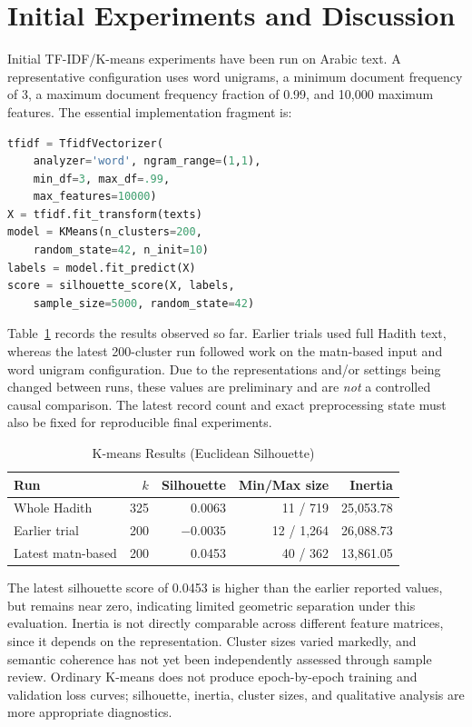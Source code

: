 \documentclass[conference]{IEEEtran}
\begin{document}
\section{Initial Experiments and Discussion}
Initial TF-IDF/K-means experiments have been run on Arabic text. A representative configuration uses word unigrams, a minimum document frequency of 3, a maximum document frequency fraction of 0.99, and 10,000 maximum features. The essential implementation fragment is:

\begin{lstlisting}[language=Python]
tfidf = TfidfVectorizer(
    analyzer='word', ngram_range=(1,1),
    min_df=3, max_df=.99,
    max_features=10000)
X = tfidf.fit_transform(texts)
model = KMeans(n_clusters=200,
    random_state=42, n_init=10)
labels = model.fit_predict(X)
score = silhouette_score(X, labels,
    sample_size=5000, random_state=42)
\end{lstlisting}

Table~\ref{tab:exp} records the results observed so far. Earlier trials used full Hadith text, whereas the latest 200-cluster run followed work on the matn-based input and word unigram configuration. Due to the representations and/or settings being changed between runs, these values are preliminary and are \emph{not} a controlled causal comparison. The latest record count and exact preprocessing state must also be fixed for reproducible final experiments.

\begin{table}[t]
\caption{K-means Results (Euclidean Silhouette)}
\label{tab:exp}
\centering\footnotesize
\begin{tabular}{lrrrr}
\toprule
Run & $k$ & Silhouette & Min/Max size & Inertia\\
\midrule
Whole Hadith & 325 & 0.0063 & 11 / 719 & 25,053.78\\
Earlier trial & 200 & $-0.0035$ & 12 / 1,264 & 26,088.73\\
Latest matn-based & 200 & 0.0453 & 40 / 362 & 13,861.05\\
\bottomrule
\end{tabular}
\end{table}

The latest silhouette score of 0.0453 is higher than the earlier reported values, but remains near zero, indicating limited geometric separation under this evaluation. Inertia is not directly comparable across different feature matrices, since it depends on the representation. Cluster sizes varied markedly, and semantic coherence has not yet been independently assessed through sample review. Ordinary K-means does not produce epoch-by-epoch training and validation loss curves; silhouette, inertia, cluster sizes, and qualitative analysis are more appropriate diagnostics.
\end{document}

